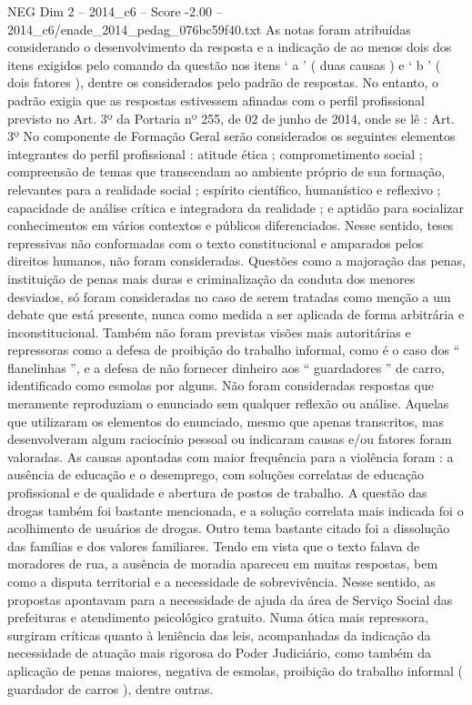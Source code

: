 \begin{textsample}{NEG Dim 2 – 2014\_c6 – Score -2.00 – 2014\_c6/enade\_2014\_pedag\_076bc59f40.txt}
As notas foram atribuídas considerando o desenvolvimento da resposta e a indicação de ao menos dois dos itens exigidos pelo comando da questão nos itens ‘ a ’ ( duas causas ) e ‘ b ’ ( dois fatores ), dentre os considerados pelo padrão de respostas.
No entanto, o padrão exigia que as respostas estivessem afinadas com o perfil profissional previsto no Art. 3º da Portaria nº 255, de 02 de junho de 2014, onde se lê : Art. 3º No componente de Formação Geral serão considerados os seguintes elementos integrantes do perfil profissional : atitude ética ; comprometimento social ; compreensão de temas que transcendam ao ambiente próprio de sua formação, relevantes para a realidade social ; espírito científico, humanístico e reflexivo ; capacidade de análise crítica e integradora da realidade ; e aptidão para socializar conhecimentos em vários contextos e públicos diferenciados.
Nesse sentido, teses repressivas não conformadas com o texto constitucional e amparados pelos direitos humanos, não foram consideradas.
Questões como a majoração das penas, instituição de penas mais duras e criminalização da conduta dos menores desviados, só foram consideradas no caso de serem tratadas como menção a um debate que está presente, nunca como medida a ser aplicada de forma arbitrária e inconstitucional.
Também não foram previstas visões mais autoritárias e repressoras como a defesa de proibição do trabalho informal, como é o caso dos “ flanelinhas ”, e a defesa de não fornecer dinheiro aos “ guardadores ” de carro, identificado como esmolas por alguns.
Não foram consideradas respostas que meramente reproduziam o enunciado sem qualquer reflexão ou análise.
Aquelas que utilizaram os elementos do enunciado, mesmo que apenas transcritos, mas desenvolveram algum raciocínio pessoal ou indicaram causas e/ou fatores foram valoradas.
As causas apontadas com maior frequência para a violência foram : a ausência de educação e o desemprego, com soluções correlatas de educação profissional e de qualidade e abertura de postos de trabalho.
A questão das drogas também foi bastante mencionada, e a solução correlata mais indicada foi o acolhimento de usuários de drogas.
Outro tema bastante citado foi a dissolução das famílias e dos valores familiares.
Tendo em vista que o texto falava de moradores de rua, a ausência de moradia apareceu em muitas respostas, bem como a disputa territorial e a necessidade de sobrevivência.
Nesse sentido, as propostas apontavam para a necessidade de ajuda da área de Serviço Social das prefeituras e atendimento psicológico gratuito.
Numa ótica mais repressora, surgiram críticas quanto à leniência das leis, acompanhadas da indicação da necessidade de atuação mais rigorosa do Poder Judiciário, como também da aplicação de penas maiores, negativa de esmolas, proibição do trabalho informal ( guardador de carros ), dentre outras.

\end{textsample}
